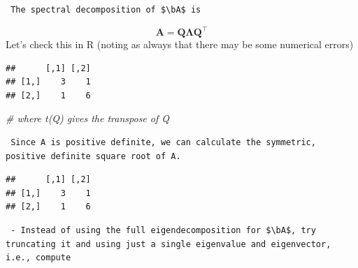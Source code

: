 \documentclass[]{book}
\newenvironment{Shaded}{\begin{snugshade}}{\end{snugshade}}
\newcommand{\CommentTok}[1]{\textcolor[rgb]{0.56,0.35,0.01}{\textit{#1}}}
\newcommand{\FloatTok}[1]{\textcolor[rgb]{0.00,0.00,0.81}{#1}}
\newcommand{\KeywordTok}[1]{\textcolor[rgb]{0.13,0.29,0.53}{\textbf{#1}}}
\newcommand{\NormalTok}[1]{#1}
\newcommand{\OperatorTok}[1]{\textcolor[rgb]{0.81,0.36,0.00}{\textbf{#1}}}
\theoremstyle{definition}
\theoremstyle{definition}
\theoremstyle{definition}
\theoremstyle{remark}
\begin{document}
\begin{verbatim}
 The spectral decomposition of $\bA$ is 
\end{verbatim}

\[\boldsymbol A= \boldsymbol Q\boldsymbol \Lambda\boldsymbol Q^\top\]
Let's check this in R (noting as always that there may be some numerical errors)

\begin{Shaded}
\end{Shaded}

\begin{verbatim}
##      [,1] [,2]
## [1,]    3    1
## [2,]    1    6
\end{verbatim}

\begin{Shaded}
\begin{Highlighting}[]
                                   \CommentTok{# where t(Q) gives the transpose of Q}
\end{Highlighting}
\end{Shaded}

\begin{verbatim}
 Since A is positive definite, we can calculate the symmetric, positive definite square root of A.
\end{verbatim}

\begin{Shaded}
\end{Shaded}

\begin{verbatim}
##      [,1] [,2]
## [1,]    3    1
## [2,]    1    6
\end{verbatim}

\begin{verbatim}
 - Instead of using the full eigendecomposition for $\bA$, try truncating it and using just a single eigenvalue and eigenvector, i.e., compute
\end{verbatim}
\end{document}
